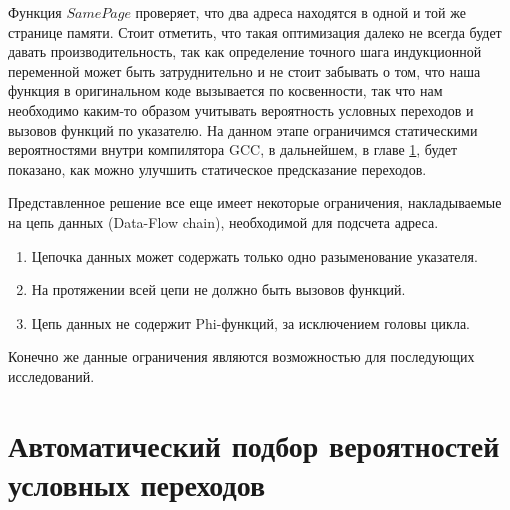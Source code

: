 Функция $SamePage$ проверяет, что два адреса находятся в одной и той же странице памяти. Стоит отметить, что такая оптимизация далеко не всегда будет давать производительность, так как определение точного шага индукционной переменной может быть затруднительно и не стоит забывать о том, что наша функция в оригинальном коде вызывается по косвенности, так что нам необходимо каким-то образом учитывать вероятность условных переходов и вызовов функций по указателю. На данном этапе ограничимся статическими вероятностями внутри компилятора GCC, в дальнейшем, в главе \ref{op:mlpgo}, будет показано, как можно улучшить статическое предсказание переходов. 

Представленное решение все еще имеет некоторые ограничения, накладываемые на цепь данных (Data-Flow chain), необходимой для подсчета адреса.
\begin{enumerate}
	\item Цепочка данных может содержать только одно разыменование указателя.
	\item На протяжении всей цепи не должно быть вызовов функций.
	\item Цепь данных не содержит Phi-функций, за исключением головы цикла.
\end{enumerate}

Конечно же данные ограничения являются возможностью для последующих исследований.

\section{Автоматический подбор вероятностей условных переходов}  \label{op:mlpgo}

